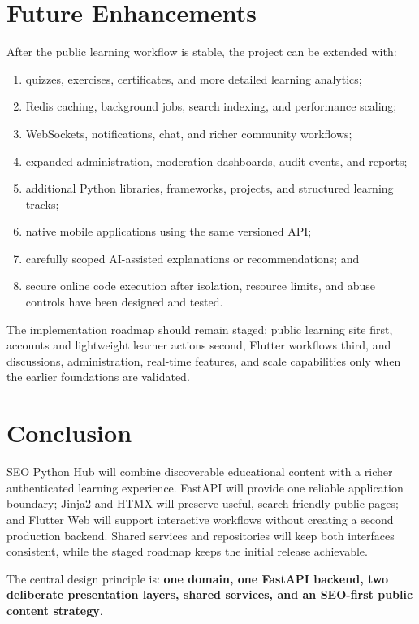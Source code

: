 \documentclass[11pt,a4paper]{article}
\begin{document}
\section{Future Enhancements}

After the public learning workflow is stable, the project can be extended with:

\begin{enumerate}
  \item quizzes, exercises, certificates, and more detailed learning analytics;
  \item Redis caching, background jobs, search indexing, and performance scaling;
  \item WebSockets, notifications, chat, and richer community workflows;
  \item expanded administration, moderation dashboards, audit events, and reports;
  \item additional Python libraries, frameworks, projects, and structured learning
        tracks;
  \item native mobile applications using the same versioned API;
  \item carefully scoped AI-assisted explanations or recommendations; and
  \item secure online code execution after isolation, resource limits, and abuse
        controls have been designed and tested.
\end{enumerate}

The implementation roadmap should remain staged: public learning site first,
accounts and lightweight learner actions second, Flutter workflows third, and
discussions, administration, real-time features, and scale capabilities only when
the earlier foundations are validated.

\section{Conclusion}

SEO Python Hub will combine discoverable educational content with a richer
authenticated learning experience. FastAPI will provide one reliable application
boundary; Jinja2 and HTMX will preserve useful, search-friendly public pages; and
Flutter Web will support interactive workflows without creating a second
production backend. Shared services and repositories will keep both interfaces
consistent, while the staged roadmap keeps the initial release achievable.

The central design principle is: \textbf{one domain, one FastAPI backend, two
deliberate presentation layers, shared services, and an SEO-first public content
strategy}.
\end{document}
